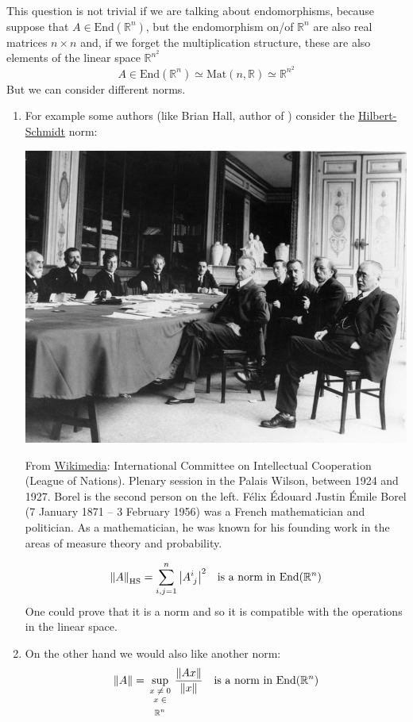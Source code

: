 \documentclass[../main.tex]{subfiles}
\begin{document}
This question is not trivial if we are talking about endomorphisms, because suppose that $A\in \textrm{End}(\mathbb{R}^n)$, but the endomorphism on/of $\mathbb{R}^n$ are also real matrices $n\times n$ and, if we forget the multiplication structure, these are also elements of the linear space $\mathbb{R}^{n^2}$
\[
A\in \textrm{End}(\mathbb{R}^n)\simeq \textrm{Mat}(n,\mathbb{R})\simeq \mathbb{R}^{n^2}
\]
But we can consider different norms. 
\begin{enumerate}
    \item For example some authors (like Brian Hall, author of ) consider the \href{https://it.wikipedia.org/wiki/Operatore_di_Hilbert-Schmidt}{Hilbert-Schmidt} norm:
    \begin{marginfigure}
	\includegraphics[width=1\linewidth]{images/lossy-page1-782px-League_of_Nations_Commission_067.tif.jpg}
	\caption[ International Committee on Intellectual Cooperation (League of Nations). Plenary session in the Palais Wilson, between 1924 and 1927.]{From \href{https://commons.wikimedia.org/wiki/File:League_of_Nations_Commission_067.tif?uselang=it}{Wikimedia}:  International Committee on Intellectual Cooperation (League of Nations). Plenary session in the Palais Wilson, between 1924 and 1927. Borel is the second person on the left. Félix Édouard Justin Émile Borel (7 January 1871 – 3 February 1956) was a French mathematician and politician. As a mathematician, he was known for his founding work in the areas of measure theory and probability.}
\end{marginfigure}
    \[
    \norm{A}_{\textrm{HS}}=\sum_{i,j=1}^n\abs{A^i_{\;j}}^2 \quad \text{is a norm in $\text{End}(\mathbb{R}^n)$}
    \]
    One could prove that it is a norm and so it is compatible with the operations in the linear space.
    \item On the other hand we would also like another norm:
    \[
    \norm{A}=\sup_{\text{\parbox{0.8 cm}{\centering $x\neq 0$ \\[-4pt] $x\in\mathbb{R}^n$}}}\frac{\norm{Ax}}{\norm{x}} \quad \text{is a norm in $\text{End}(\mathbb{R}^n)$}
    \]
\end{enumerate}
\end{document}
